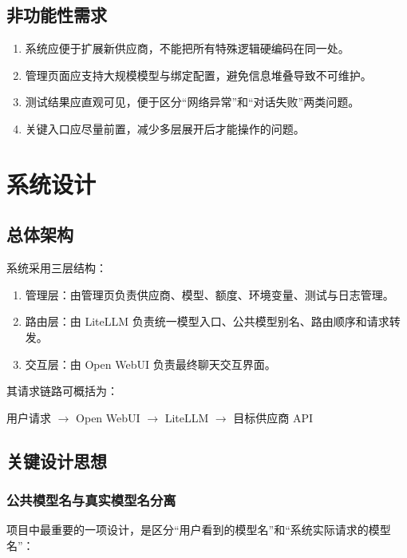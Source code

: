 \documentclass[12pt,a4paper]{ctexart}
\begin{document}
\subsection{非功能性需求}

\begin{enumerate}[label=\arabic*.]
  \item 系统应便于扩展新供应商，不能把所有特殊逻辑硬编码在同一处。
  \item 管理页面应支持大规模模型与绑定配置，避免信息堆叠导致不可维护。
  \item 测试结果应直观可见，便于区分“网络异常”和“对话失败”两类问题。
  \item 关键入口应尽量前置，减少多层展开后才能操作的问题。
\end{enumerate}

\section{系统设计}

\subsection{总体架构}

系统采用三层结构：

\begin{enumerate}[label=\arabic*.]
  \item 管理层：由管理页负责供应商、模型、额度、环境变量、测试与日志管理。
  \item 路由层：由 LiteLLM 负责统一模型入口、公共模型别名、路由顺序和请求转发。
  \item 交互层：由 Open WebUI 负责最终聊天交互界面。
\end{enumerate}

其请求链路可概括为：

\begin{center}
用户请求 $\rightarrow$ Open WebUI $\rightarrow$ LiteLLM $\rightarrow$ 目标供应商 API
\end{center}

\subsection{关键设计思想}

\subsubsection{公共模型名与真实模型名分离}

项目中最重要的一项设计，是区分“用户看到的模型名”和“系统实际请求的模型名”：
\end{document}
